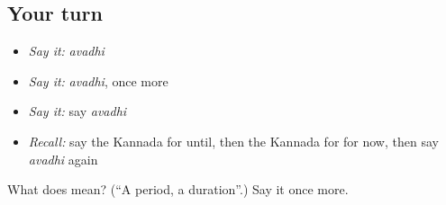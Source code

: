 \subsection*{Your turn}
\begin{itemize}
\raggedright
  \item \emph{Say it:} \emph{avadhi}
  \item \emph{Say it:} \emph{avadhi}, once more
  \item \emph{Say it:} say \emph{avadhi}
  \item \emph{Recall:} say the Kannada for until, then the Kannada for for now, then say \emph{avadhi} again
\end{itemize}

\begin{tcolorbox}[breakable,colback=teal!4,colframe=teal!35!black,title={Before you move on}]
What does  mean? (\textquotedblleft{}A period, a duration\textquotedblright{}.) Say it once more.
\end{tcolorbox}

